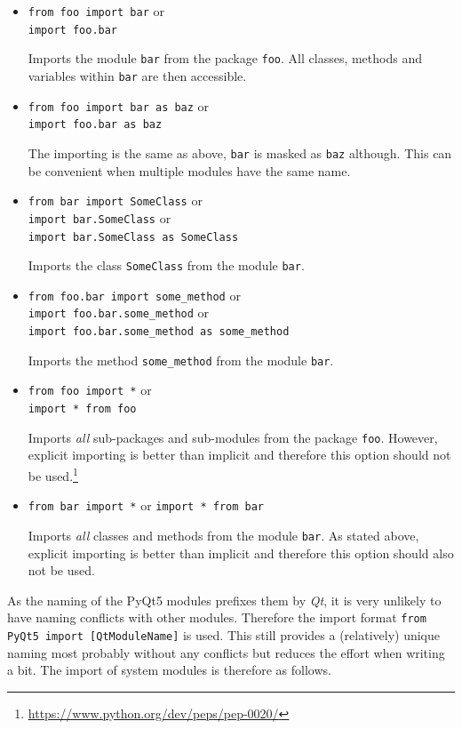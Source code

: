\documentclass[10pt, openright, notitlepage]{scrreprt}
\begin{document}
\begin{itemize}
\item \texttt{from foo import bar} or\\
\texttt{import foo.bar}

Imports the module \texttt{bar} from the package \texttt{foo}. All classes, methods and
variables within \texttt{bar} are then accessible.

\item \texttt{from foo import bar as baz} or\\
\texttt{import foo.bar as baz}

The importing is the same as above, \texttt{bar} is masked as \texttt{baz} although. This
can be convenient when multiple modules have the same name.

\item \texttt{from bar import SomeClass} or\\
\texttt{import bar.SomeClass} or\\
\texttt{import bar.SomeClass as SomeClass}

Imports the class \texttt{SomeClass} from the module \texttt{bar}.

\item \texttt{from foo.bar import some\_method} or\\
\texttt{import foo.bar.some\_method} or\\
\texttt{import foo.bar.some\_method as some\_method}

Imports the method \texttt{some\_method} from the module \texttt{bar}.

\item \texttt{from foo import *} or\\
\texttt{import * from foo}

Imports \emph{all} sub-packages and sub-modules from the package \texttt{foo}. However,
explicit importing is better than implicit and therefore this option should
not be used.\footnote{\url{https://www.python.org/dev/peps/pep-0020/}}

\item \texttt{from bar import *} or
\texttt{import * from bar}

Imports \emph{all} classes and methods from the module \texttt{bar}. As stated above,
explicit importing is better than implicit and therefore this option should
also not be used.
\end{itemize}

As the naming of the PyQt5 modules prefixes them by \emph{Qt}, it is very unlikely to
have naming conflicts with other modules. Therefore the import format \texttt{from
PyQt5 import [QtModuleName]} is used. This still provides a (relatively) unique
naming most probably without any conflicts but reduces the effort when
writing a bit. The import of system modules is therefore as follows.
\end{document}
